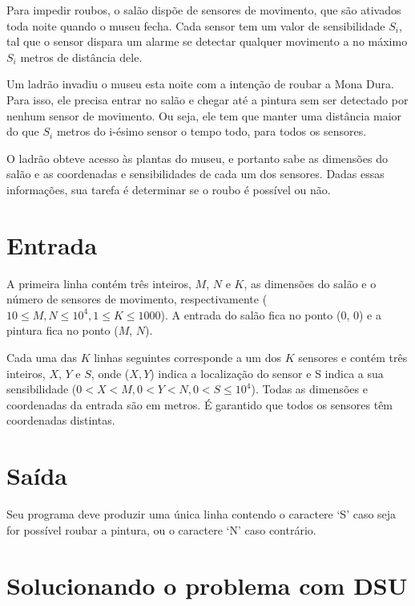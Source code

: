\documentclass[12pt]{article}
\begin{document}
Para impedir roubos, o salão dispõe de sensores de movimento, que são ativados toda noite quando o museu fecha. Cada sensor tem um valor de sensibilidade $S_i$, tal que o sensor dispara um alarme se detectar qualquer movimento a no máximo $S_i$ metros de distância dele.

Um ladrão invadiu o museu esta noite com a intenção de roubar a Mona Dura. Para isso, ele precisa entrar no salão e chegar até a pintura sem ser detectado por nenhum sensor de movimento. Ou seja, ele tem que manter uma distância maior do que $S_i$ metros do i-ésimo sensor o tempo todo, para todos os sensores.

O ladrão obteve acesso às plantas do museu, e portanto sabe as dimensões do salão e as coordenadas e sensibilidades de cada um dos sensores. Dadas essas informações, sua tarefa é determinar se o roubo é possível ou não.

\section*{Entrada}

A primeira linha contém três inteiros, $M$, $N$ e $K$, as dimensões do salão e o número de sensores de movimento, respectivamente ($10 \leq M, N \leq 10^4 , 1 \leq K \leq 1000$). A entrada do salão fica no ponto (0, 0) e a pintura fica no ponto ($M$, $N$).

Cada uma das $K$ linhas seguintes corresponde a um dos $K$ sensores e contém três inteiros, $X$, $Y$ e $S$, onde ($X, Y$) indica a localização do sensor e S indica a sua sensibilidade ($0 < X < M, 0 < Y < N, 0 < S \leq 10^4$). Todas as dimensões e coordenadas da entrada são em metros. É garantido que todos os sensores têm coordenadas distintas.

\section*{Saída}

Seu programa deve produzir uma única linha contendo o caractere `S' caso seja for possível roubar a pintura, ou o caractere `N' caso contrário.

\section{Solucionando o problema com DSU}
\end{document}
